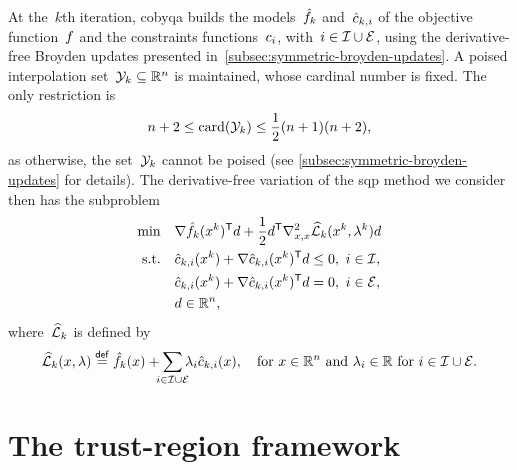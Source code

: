 At the~$k$th iteration, \gls{cobyqa} builds the models~$\objm[k]$ and~$\conm[k]{i}$ of the objective function~$f$ and the constraints functions~$c_{i}$, with~$i \in \mathcal{I} \cup \mathcal{E}$, using the derivative-free Broyden updates presented in~\cref{subsec:symmetric-broyden-updates}.
A poised interpolation set~$\xpt[k] \subseteq \R^n$ is maintained, whose cardinal number is fixed.
The only restriction is
\begin{equation*}
    n + 2 \le \card(\xpt[k]) \le \frac{1}{2} (n + 1) (n + 2),
\end{equation*}
as otherwise, the set~$\xpt[k]$ cannot be poised (see \cref{subsec:symmetric-broyden-updates} for details).
The derivative-free variation of the \gls{sqp} method we consider then has the subproblem
\begin{align*}
    \min        & \quad \nabla \objm[k](x^k)^{\T} d + \frac{1}{2} d^{\T} \nabla_{x, x}^2 \lagm[k](x^k, \lambda^k) d\\
    \text{s.t.} & \quad \conm[k]{i}(x^k) + \nabla \conm[k]{i}(x^k)^{\T} d \le 0, ~ i \in \iub,\\
                & \quad \conm[k]{i}(x^k) + \nabla \conm[k]{i}(x^k)^{\T} d = 0, ~ i \in \ieq,\\
                & \quad d \in \R^n,
\end{align*}
where~$\lagm[k]$ is defined by
\begin{equation*}
    \lagm[k](x, \lambda) \eqdef \objm[k](x) + \sum_{\mathclap{i \in \iub \cup \ieq}} \lambda_i \conm[k]{i}(x), \quad \text{for~$x \in \R^n$ and~$\lambda_i \in \R$ for~$i \in \iub \cup \ieq$}.
\end{equation*}

\section{The trust-region framework}

